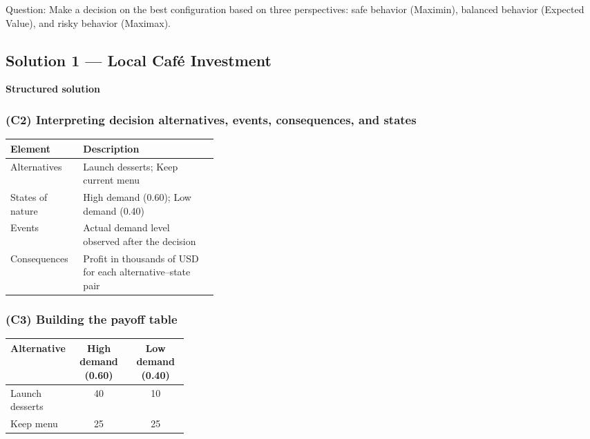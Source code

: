 Question: Make a decision on the best configuration based on three perspectives: safe behavior (Maximin), balanced behavior (Expected Value), and risky behavior (Maximax).

\subsection{Solution 1 --- Local Café Investment}\label{subsec:practice-activity-1-solution-1}

\textbf{Structured solution}

\subsubsection{(C2) Interpreting decision alternatives, events, consequences, and states}\label{subsubsec:practice-activity-1-solution-1-c2}

\begin{center}
	\begin{tabularx}{\linewidth}{@{}L{0.35\linewidth}Y@{}}
		\toprule
		Element & Description \\
		\midrule
		Alternatives & Launch desserts; Keep current menu \\
		States of nature & High demand (0.60); Low demand (0.40) \\
		Events & Actual demand level observed after the decision \\
		Consequences & Profit in thousands of USD for each alternative--state pair \\
		\bottomrule
	\end{tabularx}
\end{center}

\subsubsection{(C3) Building the payoff table}\label{subsubsec:practice-activity-1-solution-1-c3}

\begin{center}
	\begin{tabularx}{\linewidth}{@{}L{0.3\linewidth}C C@{}}
		\toprule
		Alternative & High demand (0.60) & Low demand (0.40) \\
		\midrule
		Launch desserts & 40 & 10 \\
		Keep menu & 25 & 25 \\
		\bottomrule
	\end{tabularx}
\end{center}

